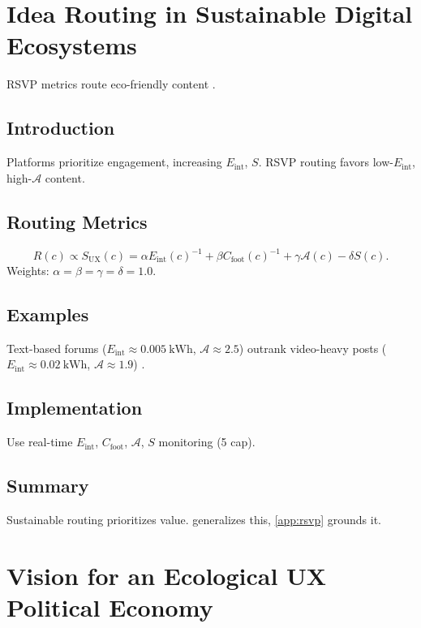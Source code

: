 \documentclass[openany]{book}
\newcommand{\Sent}{S} %
\newcommand{\Eint}{E_{\mathrm{int}}} %
\newcommand{\Cfoot}{C_{\mathrm{foot}}} %
\newcommand{\Auton}{\mathcal{A}} %
\newcommand{\SUX}{S_{\mathrm{UX}}} %
\newcommand{\kWh}{\mathrm{kWh}}
\begin{document}
\chapter{Idea Routing in Sustainable Digital Ecosystems}
\label{ch:routing}

RSVP metrics route eco-friendly content \citep{doctorow2022,designlab2024}.

\section{Introduction}
\label{sec:routing-intro}
Platforms prioritize engagement, increasing \(\Eint\), \(\Sent\). RSVP routing favors low-\(\Eint\), high-\(\Auton\) content.

\section{Routing Metrics}
\label{sec:routing-metrics}
\begin{equation}
\label{eq:routing}
R(c) \propto \SUX(c) = \alpha \Eint(c)^{-1} + \beta \Cfoot(c)^{-1} + \gamma \Auton(c) - \delta \Sent(c).
\end{equation}
Weights: \(\alpha = \beta = \gamma = \delta = 1.0\).

\section{Examples}
\label{sec:routing-examples}
Text-based forums (\(\Eint \approx \SI{0.005}{\kWh}\), \(\Auton \approx 2.5\)) outrank video-heavy posts (\(\Eint \approx \SI{0.02}{\kWh}\), \(\Auton \approx 1.9\)) \citep{doctorow2022}.

\section{Implementation}
\label{sec:routing-impl}
Use real-time \(\Eint\), \(\Cfoot\), \(\Auton\), \(\Sent\) monitoring (\SI{5}{} cap).

\section{Summary}
Sustainable routing prioritizes value.  generalizes this, \cref{app:rsvp} grounds it.

\chapter{Vision for an Ecological UX Political Economy}
\label{ch:vision}
\end{document}
